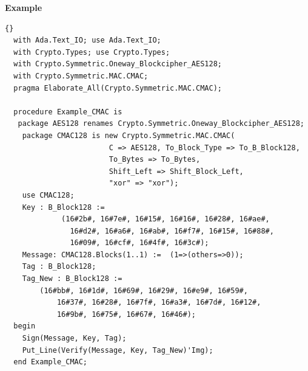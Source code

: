 \noindent\textbf{Example}
\begin{lstlisting}{}
  with Ada.Text_IO; use Ada.Text_IO;
  with Crypto.Types; use Crypto.Types;
  with Crypto.Symmetric.Oneway_Blockcipher_AES128;
  with Crypto.Symmetric.MAC.CMAC;
  pragma Elaborate_All(Crypto.Symmetric.MAC.CMAC);

  procedure Example_CMAC is
   package AES128 renames Crypto.Symmetric.Oneway_Blockcipher_AES128;
    package CMAC128 is new Crypto.Symmetric.MAC.CMAC(
						C => AES128, To_Block_Type => To_B_Block128,
						To_Bytes => To_Bytes,
						Shift_Left => Shift_Block_Left,
						"xor" => "xor");
    use CMAC128;
    Key : B_Block128 :=
             (16#2b#, 16#7e#, 16#15#, 16#16#, 16#28#, 16#ae#,
		       16#d2#, 16#a6#, 16#ab#, 16#f7#, 16#15#, 16#88#,
		       16#09#, 16#cf#, 16#4f#, 16#3c#);
    Message: CMAC128.Blocks(1..1) :=  (1=>(others=>0));
    Tag : B_Block128;
    Tag_New : B_Block128 :=
        (16#bb#, 16#1d#, 16#69#, 16#29#, 16#e9#, 16#59#,
			16#37#, 16#28#, 16#7f#, 16#a3#, 16#7d#, 16#12#,
			16#9b#, 16#75#, 16#67#, 16#46#);
  begin
    Sign(Message, Key, Tag);
    Put_Line(Verify(Message, Key, Tag_New)'Img);
  end Example_CMAC;
\end{lstlisting}

